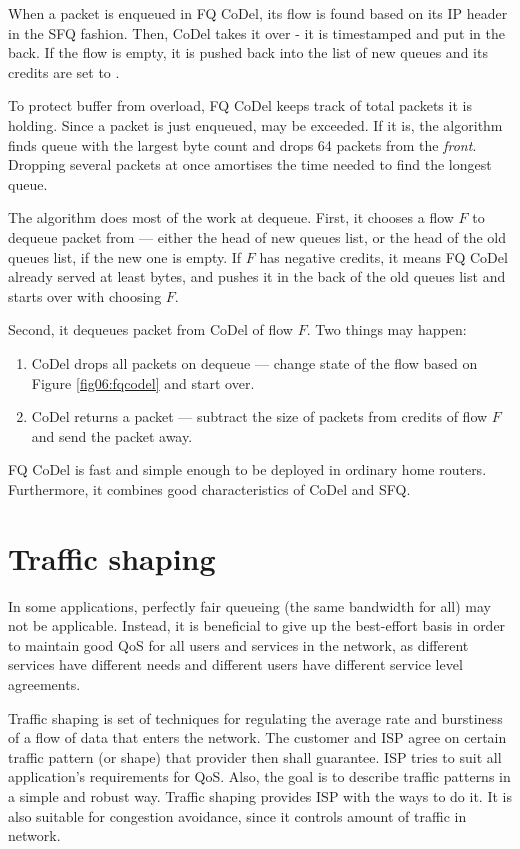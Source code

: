 When a packet is enqueued in FQ CoDel, its flow is found based on its IP header in the SFQ fashion. Then, CoDel takes it over - it is timestamped and put in the back. If the flow is empty, it is pushed back into the list of new queues and its credits are set to .

To protect buffer from overload, FQ CoDel keeps track of total packets it is holding. Since a packet is just enqueued,  may be exceeded. If it is, the algorithm finds queue with the largest byte count and drops 64 packets from the \textit{front}. Dropping several packets at once amortises the time needed to find the longest queue.

The algorithm does most of the work at dequeue. First, it chooses a flow $F$ to dequeue packet from --- either the head of new queues list, or the head of the old queues list, if the new one is empty. If $F$ has negative credits, it means FQ CoDel already served at least  bytes, and pushes it in the back of the old queues list and starts over with choosing $F$.

Second, it dequeues packet from CoDel of flow $F$. Two things may happen:
\begin{enumerate}
	\item CoDel drops all packets on dequeue --- change state of the flow based on Figure \ref{fig06:fqcodel} and start over.
	\item CoDel returns a packet --- subtract the size of packets from credits of flow $F$ and send the packet away.
\end{enumerate}

FQ CoDel is fast and simple enough to be deployed in ordinary home routers. Furthermore, it combines good characteristics of CoDel and SFQ.

\section{Traffic shaping}

In some applications, perfectly fair queueing (the same bandwidth for all) may not be applicable. Instead, it is beneficial to give up the best-effort basis in order to maintain good QoS for all users and services in the network, as different services have different needs and different users have different service level agreements. 

Traffic shaping is set of techniques for regulating the average rate and burstiness of a flow of data that enters the network. The customer and ISP agree on certain traffic pattern (or shape) that provider then shall guarantee. ISP tries to suit all application's requirements for QoS. Also, the goal is to describe traffic patterns in a simple and robust way. Traffic shaping provides ISP with the ways to do it. It is also suitable for congestion avoidance, since it controls amount of traffic in network.

